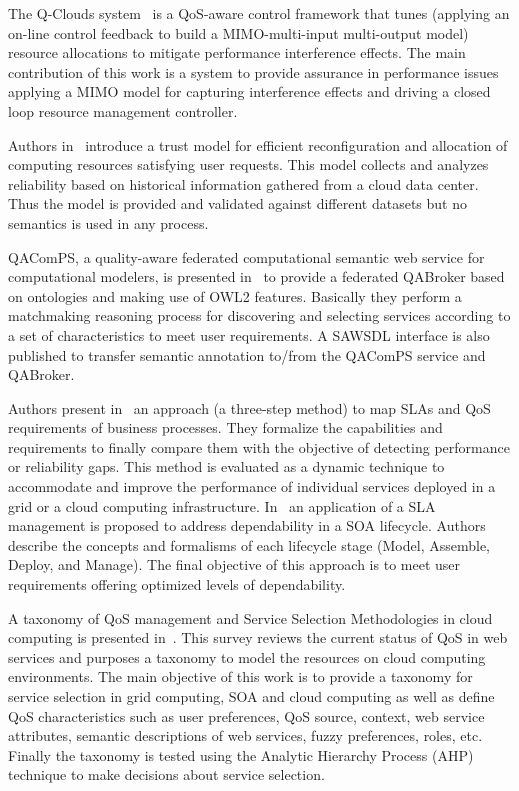 The Q-Clouds system~\cite{Nathuji:2010:QMP:1755913.1755938} is a QoS-aware 
control framework that tunes (applying an on-line control feedback to build a  MIMO-multi-input multi-output model) 
resource allocations to mitigate performance interference effects. The main contribution of this work is a system to 
provide assurance in performance issues applying a MIMO model for capturing interference effects and driving 
a closed loop resource management controller.

Authors in~\cite{DBLP:journals/ijguc/Chang11} introduce a trust model for 
efficient reconfiguration and allocation of computing resources satisfying user 
requests. This model collects and analyzes reliability based on historical information gathered from a cloud data center. 
Thus the model is provided and validated against different datasets but no semantics is used in any process. 

QAComPS, a quality-aware federated computational semantic web service for 
computational  modelers, is presented in~\cite{dewqacomps} to provide a 
federated QABroker based on ontologies and making use of OWL2 features. 
Basically they perform a matchmaking reasoning process for discovering and 
selecting services according to a set of characteristics to meet user 
requirements. A SAWSDL interface is also published to transfer semantic annotation 
to/from the QAComPS service and QABroker.

Authors present in~\cite{stantchev2009negotiating} an approach (a three-step method) 
to map SLAs and QoS requirements of business processes. They formalize the capabilities 
and requirements to finally compare them with the objective of detecting performance 
or reliability gaps. This method is evaluated as a dynamic technique to accommodate 
and improve the performance of individual services deployed in a grid or 
a cloud computing infrastructure. In~\cite{stantchev2011addressing} 
an application of a SLA management is proposed to address dependability in 
a SOA lifecycle. Authors describe the concepts and formalisms of each 
lifecycle stage (Model, Assemble, Deploy, and Manage). The final objective 
of this approach is to meet user requirements offering optimized levels 
of dependability.

A taxonomy of QoS management and Service Selection Methodologies in cloud 
computing is presented in~\cite{qos-taxonomy}. This survey reviews the current 
status of QoS in web services and purposes a taxonomy to model the resources on 
cloud computing environments. The main objective of this work is to provide a 
taxonomy for service selection in grid computing, SOA and cloud computing as 
well as define QoS characteristics such as user preferences, QoS source, 
context, web service attributes, semantic descriptions of web services, fuzzy 
preferences, roles, etc. Finally the taxonomy is tested using the Analytic 
Hierarchy Process (AHP) technique to make decisions about service selection.

